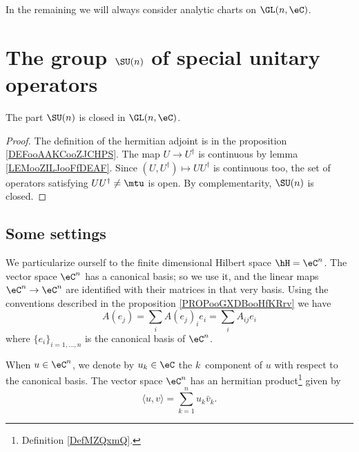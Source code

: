 In the remaining we will always consider analytic charts on \( \GL(n,\eC)\).

\section{The group \texorpdfstring{$ \SU(n)$}{SUn} of special unitary operators}

\begin{lemma}        \label{LEMooKFQOooBVtyoW}
	The part \( \SU(n)\) is closed in \( \GL(n,\eC)\).
\end{lemma}

\begin{proof}
	The definition of the hermitian adjoint is in the proposition \ref{DEFooAAKCooZJCHPS}. The map \( U\to U^{\dag}\) is continuous by lemma \ref{LEMooZILJooFfDEAF}. Since \( (U,U^{\dag})\mapsto UU^{\dag}\) is continuous too, the set of operators satisfying \( UU^{\dag}\neq\mtu\) is open. By complementarity, \( \SU(n)\) is closed.
\end{proof}

\subsection{Some settings}

We particularize ourself to the finite dimensional Hilbert space \( \hH=\eC^n\). The vector space \( \eC^n\) has a canonical basis; so we use it, and the linear maps \( \eC^n\to \eC^n\) are identified with their matrices in that very basis. Using the conventions described in the proposition \ref{PROPooGXDBooHfKRrv} we have
\begin{equation}
	A(e_j)=\sum_iA(e_j)_ie_i=\sum_iA_{ij}e_i
\end{equation}
where \( \{ e_i \}_{i=1,\ldots, n}\) is the canonical basis of \( \eC^n\).

When \( u\in \eC^n\), we denote by \( u_k\in \eC\) the \( k\)\ieme\ component of \( u\) with respect to the canonical basis. The vector space \( \eC^n\) has an hermitian product\footnote{Definition \ref{DefMZQxmQ}.} given by
\begin{equation}
	\langle u, v\rangle =\sum_{k=1}^nu_k\bar v_k.
\end{equation}

